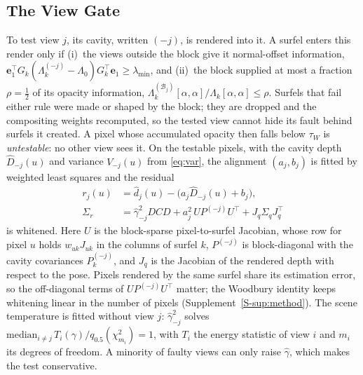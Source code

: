 \subsection{The View Gate}
\label{sec:method:gate}
To test view $j$, its cavity, written $(-j)$, is rendered into it. A surfel enters this render only if
(i)~the views outside the block give it normal-offset information,
$\mathbf{e}_1^{\top}G_k(\Lambda_k^{(-j)}-\Lambda_0)G_k^{\top}\mathbf{e}_1\ge\lambda_{\min}$, and (ii)~the block
supplied at most a fraction $\rho=\tfrac12$ of its opacity information,
$\Lambda_k^{(\mathcal{B}_j)}[\alpha,\alpha]/\Lambda_k[\alpha,\alpha]\le\rho$. Surfels that fail either rule were
made or shaped by the block; they are dropped and the compositing weights recomputed, so the tested view
cannot hide its fault behind surfels it created. A pixel whose accumulated opacity then falls below
$\tau_W$ is \emph{untestable}: no other view sees it. On the testable pixels, with the cavity depth
$\hat D_{-j}(u)$ and variance $V_{-j}(u)$ from \eqref{eq:var}, the alignment $(a_j,b_j)$ is fitted by
weighted least squares and the residual
\begin{equation}
\begin{split}
  r_j(u)&=\hat d_j(u)-\bigl(a_j\hat D_{-j}(u)+b_j\bigr),\\
  \Sigma_r&=\hat\gamma_{-j}^{2}DCD+a_j^{2}\,U P^{(-j)} U^{\top}+J_q\Sigma_qJ_q^{\top}
\end{split}
  \label{eq:res}
\end{equation}
is whitened. Here $U$ is the block-sparse pixel-to-surfel Jacobian, whose row for pixel $u$ holds
$w_{uk}J_{uk}$ in the columns of surfel $k$, $P^{(-j)}$ is block-diagonal with the cavity covariances
$P_k^{(-j)}$, and $J_q$ is the Jacobian of the rendered depth with respect to the pose. Pixels rendered by
the same surfel share its estimation error, so the off-diagonal terms of $UP^{(-j)}U^{\top}$ matter; the
Woodbury identity keeps whitening linear in the number of pixels (Supplement~\ref{S-sup:method}). The scene
temperature is fitted without view $j$: $\hat\gamma_{-j}^{2}$ solves
$\mathrm{median}_{i\ne j}\,T_i(\gamma)/q_{0.5}(\chi^{2}_{m_i})=1$, with $T_i$ the energy statistic of view
$i$ and $m_i$ its degrees of freedom. A minority of faulty views can only raise $\hat\gamma$, which makes
the test conservative.

